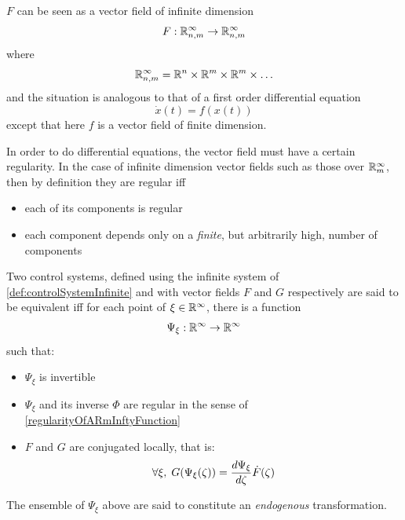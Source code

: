 \documentclass[12pt]{article}
\begin{document}
\begin{remark}
  $F$ can be seen as a vector field of infinite dimension
  \[ F : \mathbb{R}_{n,m}^\infty \to \mathbb{R}_{n,m}^\infty \]
  where 
  \[ \mathbb{R}_{n,m}^\infty = \mathbb{R}^n \times \mathbb{R}^m \times \mathbb{R}^m \times \ldots \]
  and the situation is analogous to that of a first order differential equation
  \[ \dot{x}(t)=f(x(t)) \]
  except that here $f$ is a vector field of finite dimension.
\end{remark}

\begin{remark} \label{regularityOfARmInftyFunction}
  In order to do differential equations, the vector field must have a certain regularity.
  In the case of infinite dimension vector fields such as those over $\mathbb{R}_m^\infty$,
  then by definition \cite[p.39]{MR99} they are regular iff
  \begin{itemize}
    \item each of its components is regular
    \item each component depends only on a \emph{finite}, but arbitrarily high,
      number of components
  \end{itemize}
\end{remark}

\begin{definition} \label{def:equivalentSystems}
  Two control systems, defined using the infinite system of 
\ref{def:controlSystemInfinite}
  and with vector fields $F$ and $G$ respectively are said to be equivalent iff
  for each point of $\xi \in \mathbb{R}^\infty$, there is a function
  \begin{align*}
    \Psi_\xi : \mathbb{R}^\infty \to \mathbb{R}^\infty
  \end{align*}
  such that:
  \begin{itemize}
    \item $\Psi_\xi$ is invertible
    \item $\Psi_\xi$ and its inverse $\Phi$ are regular in the sense of \ref{regularityOfARmInftyFunction}
    \item $F$ and $G$ are conjugated locally, that is:
      \begin{align*}
        \forall \xi, \; G(\Psi_\xi(\zeta)) 
        = \frac{d\Psi_\xi}{d\zeta} \dot F(\zeta)
      \end{align*} 
  \end{itemize}
  The ensemble of $\Psi_\xi$ above are said to constitute an \emph{endogenous} transformation.
\end{definition}
\end{document}

